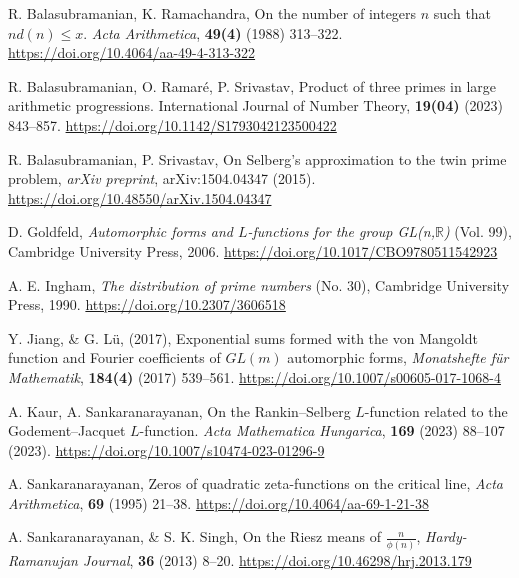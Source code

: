 \documentclass[sn-mathphys,Numbered]{sn-jnl}
\theoremstyle{thmstyleone}%
\theoremstyle{thmstyletwo}%
\theoremstyle{thmstylethree}%
\begin{document}
\begin{thebibliography}{8}

R. Balasubramanian, K. Ramachandra, On the number of integers $n$ such that $n d(n) \leq x$. \emph{Acta Arithmetica}, {\bf 49(4)} (1988) 313--322. \url{https://doi.org/10.4064/aa-49-4-313-322}

R. Balasubramanian, O. Ramar\'{e}, P. Srivastav, Product of three primes in large arithmetic progressions. International Journal of Number Theory, {\bf 19(04)} (2023) 843--857. \url{https://doi.org/10.1142/S1793042123500422}

R. Balasubramanian, P. Srivastav, On Selberg's approximation to the twin prime problem, \emph{arXiv preprint}, arXiv:1504.04347 (2015). \url{https://doi.org/10.48550/arXiv.1504.04347}

D. Goldfeld, \emph{Automorphic forms and $L$-functions for the group GL(n,$\mathbb{R}$)} (Vol. 99), Cambridge University Press, 2006. \url{https://doi.org/10.1017/CBO9780511542923}

A. E. Ingham, \emph{The distribution of prime numbers} (No. 30), Cambridge University Press, 1990. \url{https://doi.org/10.2307/3606518}

Y. Jiang, \&  G. L\"{u}, (2017), Exponential sums formed with the von Mangoldt function and Fourier coefficients of ${GL}(m)$ automorphic forms, \emph{Monatshefte für Mathematik}, \textbf{184(4)} (2017) 539--561. \url{https://doi.org/10.1007/s00605-017-1068-4}

A. Kaur, A. Sankaranarayanan, On the Rankin–Selberg $L$-function related to the Godement–Jacquet $L$-function. \emph{Acta Mathematica Hungarica}, {\bf 169} (2023) 88--107 (2023). \url{https://doi.org/10.1007/s10474-023-01296-9}

A. Sankaranarayanan, Zeros of quadratic zeta-functions on the critical line, \emph{Acta Arithmetica}, \textbf{69} (1995) 21--38. \url{https://doi.org/10.4064/aa-69-1-21-38}

A. Sankaranarayanan, \& S. K. Singh, On the Riesz means of $\frac {n}{\phi (n)}$, \emph{Hardy-Ramanujan Journal}, \textbf{36} (2013) 8--20. \url{https://doi.org/10.46298/hrj.2013.179}

\end{thebibliography}
\end{document}
